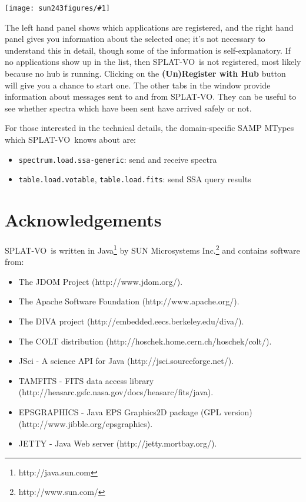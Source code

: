 \documentclass[twoside,11pt]{article}
\newcommand{\htmladdnormallinkfoot}[2]{#1\footnote{#2}}
\newcommand{\htmladdnormallink}[2]{#1}
\newcommand{\htmladdimg}[1]{}
\newcommand{\latexhtml}[2]{#1}
\renewcommand{\_}{\texttt{\symbol{95}}}
\newcommand{\SPLAT}{\textsf{SPLAT-VO}}
\newcommand{\mainfigure}[1]
{\begin{center}
 \latexhtml{\texttt{[image: sun243\_figures/\#1]}}{\htmladdimg{#1.gif}}
 \end{center}
}
\newcommand{\labelitem}[1]{\textbf{#1}}
\newcommand{\hitext}[1]{\texttt{#1}}
\begin{document}
\mainfigure{sampwindow}

The left hand panel shows which applications are registered,
and the right hand panel gives you information about the selected one;
it's not necessary to understand this in detail, though
some of the information is self-explanatory.
If no applications show up in the list, then \SPLAT\ is not registered,
most likely because no hub is running.  Clicking on the
\labelitem{(Un)Register with Hub} button will give you a chance to start one.
The other tabs in the window provide information about messages
sent to and from \SPLAT.  They can be useful to
see whether spectra which have been sent have arrived safely or not.

For those interested in the technical details, the domain-specific
SAMP MTypes which \SPLAT\ knows about are:
\begin{itemize}
\item \hitext{spectrum.load.ssa-generic}:
      send and receive spectra
\item \hitext{table.load.votable}, \hitext{table.load.fits}:
      send SSA query results
\end{itemize}

\newpage
\section{Acknowledgements}

\SPLAT\ is written in
\htmladdnormallinkfoot{Java}{http://java.sun.com} by
\htmladdnormallinkfoot{SUN Microsystems Inc.}{http://www.sun.com/} and
contains software from:
\begin{itemize}
\item The JDOM Project (\htmladdnormallink{http://www.jdom.org/}
                                          {http://www.jdom.org/}).
\item The Apache Software Foundation
      (\htmladdnormallink{http://www.apache.org/}
                         {http://www.apache.org/}).
\item The DIVA project
      (\htmladdnormallink{http://embedded.eecs.berkeley.edu/diva/}
                         {http://embedded.eecs.berkeley.edu/diva/}).
\item The COLT distribution
      (\htmladdnormallink{http://hoschek.home.cern.ch/hoschek/colt/}
                         {http://hoschek.home.cern.ch/hoschek/colt/}).
\item JSci - A science API for Java
      (\htmladdnormallink{http://jsci.sourceforge.net/}
                         {http://jsci.sourceforge.net/}).
\item TAMFITS - FITS data access library
      (\htmladdnormallink{http://heasarc.gsfc.nasa.gov/docs/heasarc/fits/java}
                         {http://heasarc.gsfc.nasa.gov/docs/heasarc/fits/java}).
\item EPSGRAPHICS - Java EPS Graphics2D package (GPL version)
      (\htmladdnormallink{http://www.jibble.org/epsgraphics}
                         {http://www.jibble.org/epsgraphics}).
\item JETTY - Java Web server
      (\htmladdnormallink{http://jetty.mortbay.org/}
                         {http://jetty.mortbay.org/}).
\end{itemize}
\end{document}
